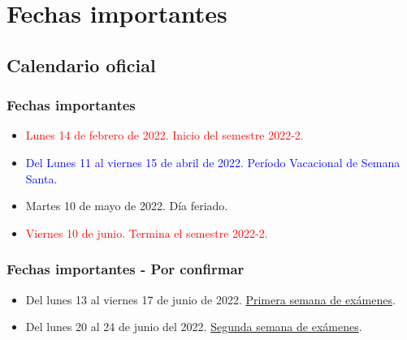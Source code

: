 \documentclass[12pt]{beamer}
\begin{document}
\section{Fechas importantes}
\subsection{Calendario oficial}

\begin{frame}
\frametitle{Fechas importantes}
\begin{itemize}[<+->]
\item \textcolor{red}{Lunes 14 de febrero de 2022. Inicio del semestre 2022-2.}
\item \textcolor{blue}{Del Lunes 11 al viernes 15 de abril de 2022. Período Vacacional de Semana Santa.}
\item Martes 10 de mayo de 2022. Día feriado.
\item \textcolor{red}{Viernes 10 de junio. Termina el semestre 2022-2.}
\end{itemize}
\end{frame}
\begin{frame}
\frametitle{Fechas importantes - Por confirmar}
\begin{itemize}[<+->]
\item Del lunes 13 al viernes 17 de junio de 2022. \underline{Primera semana de exámenes}.
\item Del lunes 20 al 24 de junio del 2022. \underline{Segunda semana de exámenes}.
\end{itemize}
\end{frame}
\end{document}

